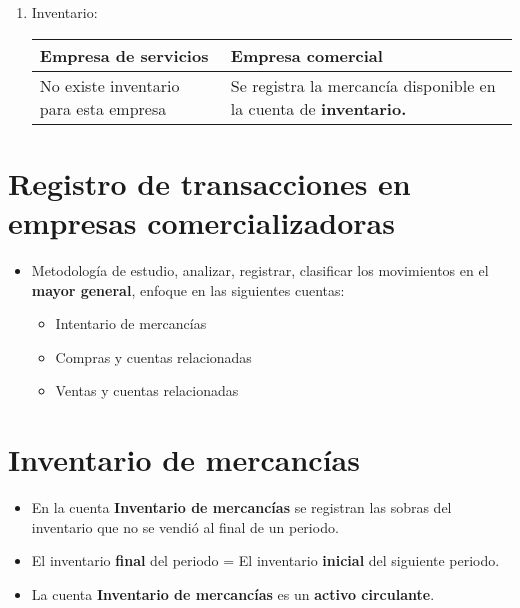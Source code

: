 \documentclass{article}
\begin{document}
\begin{enumerate}
\begin{center}
\begin{tabular}{ | p{5cm} | p{9cm} | }
    \hline
    \end{tabular}
    \end{center}
    
    
    \item Inventario:
    \begin{center}
    \begin{tabular}{ | p{5cm} | p{9cm} | }
    \hline
    Empresa de servicios & Empresa comercial\\
    \hline
    No existe inventario para esta empresa & Se registra la mercancía disponible en la cuenta de \textbf{inventario.}\\ 

    \hline
    \end{tabular}
    \end{center}

\end{enumerate}

\section{Registro de transacciones en empresas comercializadoras}
\begin{itemize}
    \item Metodología de estudio, analizar, registrar, clasificar los movimientos en el \textbf{mayor general}, enfoque en las siguientes cuentas:
    \begin{itemize}
        \item Intentario de mercancías 
        \item Compras y cuentas relacionadas
        \item Ventas y cuentas relacionadas 
    \end{itemize}
\end{itemize}
\section{Inventario de mercancías}
\begin{itemize}
    \item En la cuenta \textbf{Inventario de mercancías} se registran las sobras del inventario que no se vendió al final de un periodo.
    \item El inventario \textbf{final} del periodo = El inventario \textbf{inicial} del siguiente periodo.
    \item La cuenta \textbf{Inventario de mercancías} es un \textbf{activo circulante}.
\end{itemize}
\end{document}

